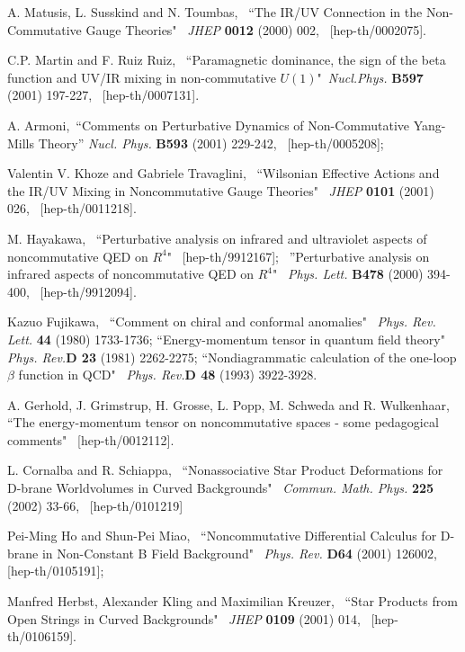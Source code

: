 \documentclass[a4paper,12pt]{article}
\begin{document}
\begin{thebibliography}{References}
A. Matusis, L. Susskind and N. Toumbas, \, ``The IR/UV Connection in the 
Non-Commutative Gauge Theories" \, {\it JHEP} {\bf 0012} (2000) 002, \,
[hep-th/0002075].


C.P. Martin and F. Ruiz Ruiz, \, ``Paramagnetic dominance, the sign of the beta function and UV/IR mixing in non-commutative $U(1)$"\, 
{\it Nucl.Phys.} {\bf B597} (2001) 197-227, \, [hep-th/0007131].

A. Armoni, \,``Comments on Perturbative Dynamics of Non-Commutative Yang-Mills 
Theory'' {\it Nucl. Phys.} {\bf B593} (2001) 229-242, \, [hep-th/0005208]; 

Valentin V. Khoze and Gabriele Travaglini, \, ``Wilsonian Effective Actions and the IR/UV Mixing in Noncommutative Gauge Theories" \, 
{\it JHEP} {\bf 0101} (2001) 026, \, [hep-th/0011218]. 

M. Hayakawa, \, ``Perturbative analysis on infrared and ultraviolet aspects of 
noncommutative QED on ${R}^4$" \, [hep-th/9912167]; \,
''Perturbative analysis on infrared aspects of noncommutative QED on ${R}^4$" 
\, {\it Phys. Lett.} {\bf B478} (2000) 394-400, \, [hep-th/9912094]. 

Kazuo Fujikawa, \, ``Comment on chiral and conformal anomalies" 
\, {\it Phys. Rev. Lett.} {\bf 44} (1980) 1733-1736; 
``Energy-momentum tensor in quantum field theory" 
\, {\it Phys. Rev.}{\bf D 23} (1981) 2262-2275; 
``Nondiagrammatic calculation of the one-loop $\beta$ function in QCD" 
\, {\it Phys. Rev.}{\bf D 48} (1993) 3922-3928. 

A. Gerhold, J. Grimstrup, H. Grosse, L. Popp, M. Schweda and R. Wulkenhaar, \, 
``The energy-momentum tensor on noncommutative spaces - some pedagogical 
comments"  \, [hep-th/0012112]. 

L. Cornalba and R. Schiappa, \,
``Nonassociative Star Product Deformations for D-brane Worldvolumes in Curved 
Backgrounds" \, {\it Commun. Math. Phys.} {\bf 225} (2002) 33-66, 
\, [hep-th/0101219] 

Pei-Ming Ho and Shun-Pei Miao, \, 
``Noncommutative Differential Calculus for D-brane in Non-Constant B Field 
Background"  \, {\it Phys. Rev.} {\bf D64} (2001) 126002, \,[hep-th/0105191]; 

Manfred Herbst, Alexander Kling and Maximilian Kreuzer, \,
``Star Products from Open Strings in Curved Backgrounds"  
\, {\it JHEP} {\bf 0109} (2001) 014, \, [hep-th/0106159]. 

\end{thebibliography}
\end{document}
